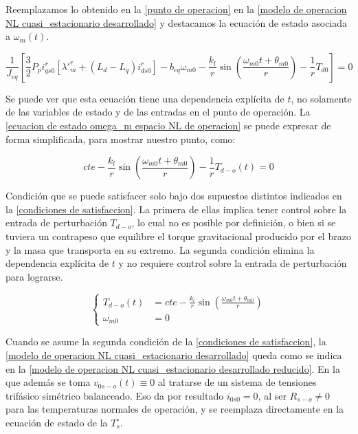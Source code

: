 \documentclass[a4paper, 10pt, onecolumn,journal]{ieeeconf}
\begin{document}
Reemplazamos lo obtenido en la \cref{punto de operacion} en la \cref{modelo de operacion NL cuasi_estacionario desarrollado}
y destacamos la ecuación de estado asociada a $\omega_m(t)$.

\begin{equation}    
    \frac{1}{J_{eq}}\left[\frac{3}{2} P_p i^r_{qs0}\left[\lambda'^r_m + (L_d - L_q) i^r_{ds0} \right] - b_{eq}\omega_{m0} - \frac{k_l}{r}\sin\left(\frac{\omega_{m0}t + \theta_{m0}}{r}\right) - \frac{1}{r}T_{d0}\right] = 0
    \label{ecuacion de estado omega_m espacio NL de operacion}
\end{equation}

Se puede ver que esta ecuación
tiene  una dependencia explícita de $t$, no solamente de las variables de 
estado y de las entradas en el punto de operación. La \cref{ecuacion de estado omega_m espacio NL de operacion}
se puede expresar de forma simplificada, para mostrar nuestro punto, como:

\begin{equation}    
    cte - \frac{k_l}{r}\sin\left(\frac{\omega_{m0}t + \theta_{m0}}{r}\right) - \frac{1}{r}T_{d-o}(t) = 0
    \label{ecuacion de estado omega_m espacio NL de operacion simplificada}
\end{equation}

Condición que se puede satisfacer solo bajo dos supuestos distintos indicados en la \cref{condiciones de satisfaccion}.
La primera de ellas implica tener control sobre la entrada de perturbación $T_{d-o}$, lo cual
no es posible por definición, o bien si se tuviera un contrapeso que equilibre el torque
gravitacional producido por el brazo y la masa que transporta en su extremo. La segunda condición
elimina la dependencia explícita de $t$ y no requiere control sobre la entrada de perturbación para
lograrse.

\begin{equation}
    \begin{cases}
        T_{d-o}(t) &= cte - \frac{k_l}{r}\sin\left(\frac{\omega_{m0}t + \theta_{m0}}{r}\right)\\
        \omega_{m0} &= 0
    \end{cases}
    \label{condiciones de satisfaccion}
\end{equation}

Cuando se asume la segunda condición de la \cref{condiciones de satisfaccion},
la \cref{modelo de operacion NL cuasi_estacionario desarrollado} queda como se indica en la 
\cref{modelo de operacion NL cuasi_estacionario desarrollado reducido}. En la que
además se toma $v_{0s-o}(t) \equiv 0$ al tratarse de un sistema de
tensiones trifásico simétrico balanceado. Eso da por resultado $i_{0s0} = 0$,
al ser $R_{s-o} \neq 0$ para las temperaturas normales de operación, y se reemplaza directamente en la 
ecuación de estado de la $T^{\circ}_{s}$.
\end{document}
